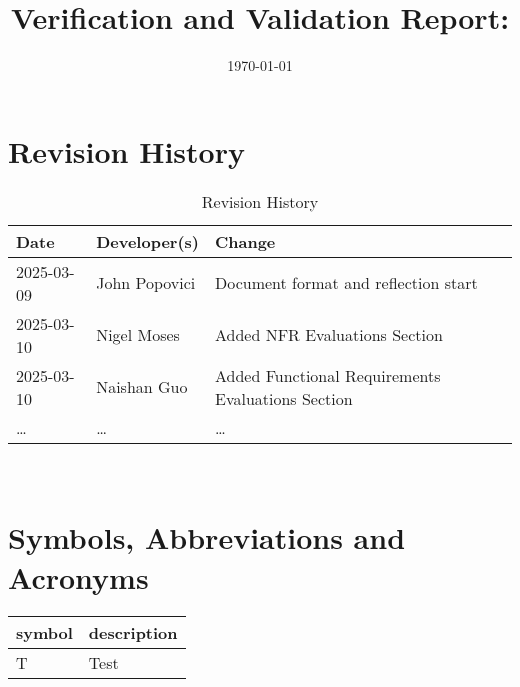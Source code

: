 \documentclass[12pt, titlepage]{article}
\begin{document}
\title{Verification and Validation Report: \progname} 
\author{\authname}
\date{\today}
	
\maketitle


\section{Revision History}

\begin{table}[hp]
\caption{Revision History} \label{TblRevisionHistory}
\begin{tabularx}{\textwidth}{llX}
\toprule
\textbf{Date} & \textbf{Developer(s)} & \textbf{Change}\\
\midrule
2025-03-09 & John Popovici & Document format and reflection start\\
2025-03-10 & Nigel Moses & Added NFR Evaluations Section\\
2025-03-10 & Naishan Guo & Added Functional Requirements Evaluations Section\\
\dots & \dots & \dots \\
\bottomrule
\end{tabularx}
\end{table}

~\newpage

\section{Symbols, Abbreviations and Acronyms}

\renewcommand{\arraystretch}{1.2}
\begin{tabular}{l l} 
  \toprule		
  \textbf{symbol} & \textbf{description}\\
  \midrule 
  T & Test\\
  \bottomrule
\end{tabular}\\


\newpage

\tableofcontents

\listoftables %

\listoffigures %

\newpage
\end{document}
